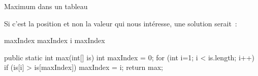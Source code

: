 \begin{Fiche}{Maximum dans un tableau}

	Si c'est la position et non la valeur qui nous intéresse, une solution 
	serait~:

	\begin{pseudocode}
			\Let maxIndex 
					\Let maxIndex \Gets i
				\EndIf
			\EndFor
			\Return maxIndex
		\EndAlgo
	\end{pseudocode}
	
	\begin{java}
public static int max(int[] is){
	int maxIndex = 0;
	for (int i=1; i < is.length; i++){
		if (is[i] > is[maxIndex]){
			maxIndex = i;
		}
	}
	return max;
}
	\end{java}
	
\end{Fiche}
